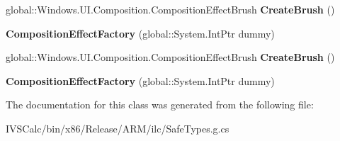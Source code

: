 \begin{DoxyCompactItemize}
global\+::\+Windows.\+U\+I.\+Composition.\+Composition\+Effect\+Brush {\bfseries Create\+Brush} ()
\item 
\mbox{\label{class_windows_1_1_u_i_1_1_composition_1_1_composition_effect_factory_aac8981559891c2f63ce2b6f23b7a9be9}} 
{\bfseries Composition\+Effect\+Factory} (global\+::\+System.\+Int\+Ptr dummy)
\item 
\mbox{\label{class_windows_1_1_u_i_1_1_composition_1_1_composition_effect_factory_ae8a97d54a435c9235ac2fafc2a88b1b8}} 
global\+::\+Windows.\+U\+I.\+Composition.\+Composition\+Effect\+Brush {\bfseries Create\+Brush} ()
\item 
\mbox{\label{class_windows_1_1_u_i_1_1_composition_1_1_composition_effect_factory_aac8981559891c2f63ce2b6f23b7a9be9}} 
{\bfseries Composition\+Effect\+Factory} (global\+::\+System.\+Int\+Ptr dummy)
\end{DoxyCompactItemize}


The documentation for this class was generated from the following file\+:\begin{DoxyCompactItemize}
\item 
I\+V\+S\+Calc/bin/x86/\+Release/\+A\+R\+M/ilc/Safe\+Types.\+g.\+cs\end{DoxyCompactItemize}

